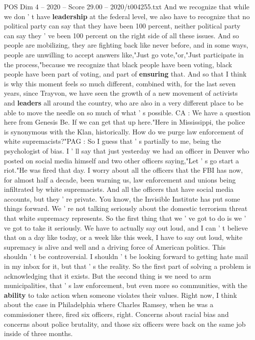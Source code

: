 \begin{textsample}{POS Dim 4 – 2020 – Score 29.00 – 2020/t004255.txt}
And we recognize that while we don ' t have \textbf{leadership} at the federal level, we also have to recognize that no political party can say that they have been 100 percent, neither political party can say they ' ve been 100 percent on the right side of all these issues.
And so people are mobilizing, they are fighting back like never before, and in some ways, people are unwilling to accept answers like,"Just go vote,"or,"Just participate in the process,"because we recognize that black people have been voting, black people have been part of voting, and part of \textbf{ensuring} that.
And so that I think is why this moment feels so much different, combined with, for the last seven years, since Trayvon, we have seen the growth of a new movement of activists and \textbf{leaders} all around the country, who are also in a very different place to be able to move the needle on so much of what ' s possible.
CA : We have a question here from Genesis Be.
If we can get that up here."Here in Mississippi, the police is synonymous with the Klan, historically.
How do we purge law enforcement of white supremacists?"PAG : So I guess that ' s partially to me, being the psychologist of bias.
I ' ll say that just yesterday we had an officer in Denver who posted on social media himself and two other officers saying,"Let ' s go start a riot."He was fired that day.
I worry about all the officers that the FBI has now, for almost half a decade, been warning us, law enforcement and unions being infiltrated by white supremacists.
And all the officers that have social media accounts, but they ' re private.
You know, the Invisible Institute has put some things forward.
We ' re not talking seriously about the domestic terrorism threat that white supremacy represents.
So the first thing that we ' ve got to do is we ' ve got to take it seriously.
We have to actually say out loud, and I can ' t believe that on a day like today, or a week like this week, I have to say out loud, white supremacy is alive and well and a driving force of American politics.
This shouldn ' t be controversial.
I shouldn ' t be looking forward to getting hate mail in my inbox for it, but that ' s the reality.
So the first part of solving a problem is acknowledging that it exists.
But the second thing is we need to arm municipalities, that ' s law enforcement, but even more so communities, with the \textbf{ability} to take action when someone violates their values.
Right now, I think about the case in Philadelphia where Charles Ramsey, when he was a commissioner there, fired six officers, right.
Concerns about racial bias and concerns about police brutality, and those six officers were back on the same job inside of three months.

\end{textsample}
